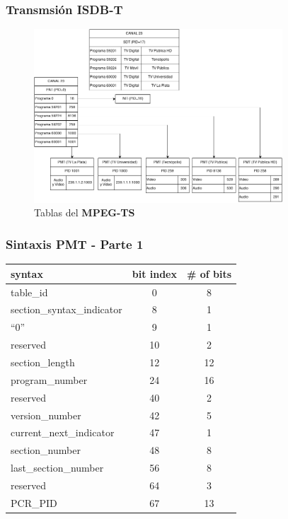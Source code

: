 \documentclass[a4paper,11pt]{beamer}
\begin{document}

\begin{frame}
\frametitle{Transmsión ISDB-T}
\begin{center}
\begin{figure}
 \includegraphics[height=6.5cm]{canal_23_extended_tables.png} \caption{Tablas del \textbf{MPEG-TS}}
\end{figure}
\end{center}
\end{frame}


\begin{frame}
\frametitle{Sintaxis PMT - Parte 1}
\begin{tabular}{ l | c | c }
syntax & bit index & \# of bits \\
\hline 
table\_id & 0 & 8 \\
section\_syntax\_indicator & 8 & 1 \\
``0'' & 9 & 1 \\
reserved & 10 & 2 \\
section\_length & 12 & 12 \\
program\_number & 24 & 16 \\
reserved & 40 & 2 \\
version\_number & 42 & 5 \\
current\_next\_indicator & 47 & 1 \\
section\_number & 48 & 8 \\
last\_section\_number & 56 & 8 \\
reserved & 64 & 3 \\
PCR\_PID & 67 & 13 \\
\end{tabular}
\end{frame}

\end{document}
